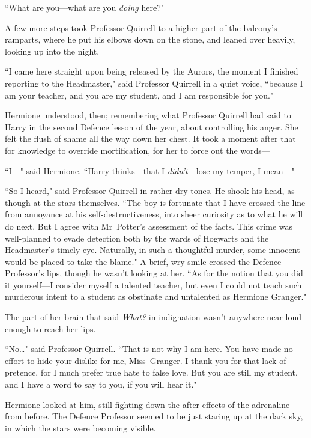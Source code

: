 ``What are you—what are you \emph{doing} here?"

A few more steps took Professor Quirrell to a higher part of the balcony's ramparts, where he put his elbows down on the stone, and leaned over heavily, looking up into the night.

``I came here straight upon being released by the Aurors, the moment I finished reporting to the Headmaster," said Professor Quirrell in a quiet voice, ``because I am your teacher, and you are my student, and I am responsible for you."

Hermione understood, then; remembering what Professor Quirrell had said to Harry in the second Defence lesson of the year, about controlling his anger. She felt the flush of shame all the way down her chest. It took a moment after that for knowledge to override mortification, for her to force out the words—

``I—" said Hermione. ``Harry thinks—that I \emph{didn't}—lose my temper, I mean—"

``So I heard," said Professor Quirrell in rather dry tones. He shook his head, as though at the stars themselves. ``The boy is fortunate that I have crossed the line from annoyance at his self-destructiveness, into sheer curiosity as to what he will do next. But I agree with Mr~Potter's assessment of the facts. This crime was well-planned to evade detection both by the wards of Hogwarts and the Headmaster's timely eye. Naturally, in such a thoughtful murder, some innocent would be placed to take the blame." A brief, wry smile crossed the Defence Professor's lips, though he wasn't looking at her. ``As for the notion that you did it yourself—I consider myself a talented teacher, but even I could not teach such murderous intent to a student as obstinate and untalented as Hermione Granger."

The part of her brain that said \emph{What?} in indignation wasn't anywhere near loud enough to reach her lips.

``No{\ldots}" said Professor Quirrell. ``That is not why I am here. You have made no effort to hide your dislike for me, Miss~Granger. I thank you for that lack of pretence, for I much prefer true hate to false love. But you are still my student, and I have a word to say to you, if you will hear it."

Hermione looked at him, still fighting down the after-effects of the adrenaline from before. The Defence Professor seemed to be just staring up at the dark sky, in which the stars were becoming visible.

